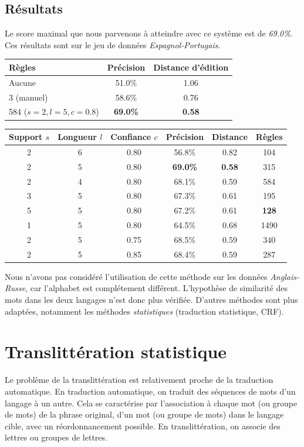\documentclass{article}
\begin{document}
\subsection{Résultats}
Le score maximal que nous parvenons à atteindre avec ce système est de \emph{69.0\%}. Ces résultats sont sur le jeu de données \emph{Espagnol-Portugais}.
\begin{center}
\begin{tabular}{|l|c|c|}
\hline
Règles&Précision&Distance d'édition\\
\hline
Aucune&51.0\%&1.06\\
\hline
3 (manuel)&58.6\%&0.76\\
\hline
584 ($s=2, l=5, c=0.8$)&\textbf{69.0\%}&\textbf{0.58}\\
\hline
\end{tabular}
\end{center}

\begin{center}
\begin{tabular}{|c|c|c||c|c|c|}
\hline
Support $s$&Longueur $l$&Confiance $c$&Précision&Distance&Règles\\
\hline
2&6&0.80&56.8\%&0.82&104\\
\hline
2&5&0.80&\textbf{69.0\%}&\textbf{0.58}&315\\
\hline
2&4&0.80&68.1\%&0.59&584\\
\hline
\hline
3&5&0.80&67.3\%&0.61&195\\
\hline
5&5&0.80&67.2\%&0.61&\textbf{128}\\
\hline
1&5&0.80&64.5\%&0.68&1490\\
\hline
\hline
2&5&0.75&68.5\%&0.59&340\\
\hline
2&5&0.85&68.4\%&0.59&287\\
\hline
\end{tabular}
\end{center}

Nous n'avons pas considéré l'utilisation de cette méthode sur les données \emph{Anglais-Russe}, car l'alphabet est complétement différent. L'hypothèse de similarité des mots dans les deux langages n'est donc plus vérifiée. D'autres méthodes sont plus adaptées, notamment les méthodes \emph{statistiques} (traduction statistique, CRF).


\section{Translittération statistique}
Le problème de la translittération est relativement proche de la traduction automatique. En traduction automatique, on traduit des séquences de mots d'un langage à un autre. Cela se caractérise par l'association à chaque mot (ou groupe de mots) de la phrase original, d'un mot (ou groupe de mots) dans le langage cible, avec un réordonnancement possible. En translittération, on associe des lettres ou groupes de lettres.
\end{document}
